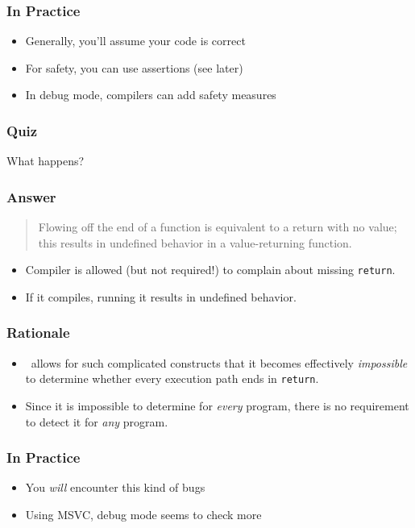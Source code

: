 \documentclass{../ucll-slides}
\begin{document}
\begin{frame}
  \frametitle{In Practice}
  \begin{itemize}
    \item Generally, you'll assume your code is correct
    \item For safety, you can use assertions (see later)
    \item In debug mode, compilers can add safety measures
  \end{itemize}
\end{frame}

\begin{frame}
  \frametitle{Quiz}
  \begin{center}
    {\Large What happens?}\vskip2cm
  \end{center}
\end{frame}

\begin{frame}
  \frametitle{Answer}
  \begin{quote}
    Flowing off the end of a function is equivalent to a return with no value; this results in undefined
    behavior in a value-returning function. \\
    \hfill {}
  \end{quote}
  \begin{itemize}
    \item Compiler is allowed (but not required!) to complain about missing {\tt return}.
    \item If it compiles, running it results in undefined behavior.
  \end{itemize}
\end{frame}

\begin{frame}
  \frametitle{Rationale}
  \begin{itemize}
    \item \cpp\ allows for such complicated constructs
          that it becomes effectively \emph{impossible}
          to determine whether every execution path ends in {\tt return}.
    \item Since it is impossible to determine for \emph{every} program,
          there is no requirement to detect it for \emph{any} program.
  \end{itemize}
\end{frame}

\begin{frame}
  \frametitle{In Practice}
  \begin{itemize}
    \item You \emph{will} encounter this kind of bugs
    \item Using MSVC, debug mode seems to check more
  \end{itemize}
\end{frame}
\end{document}
